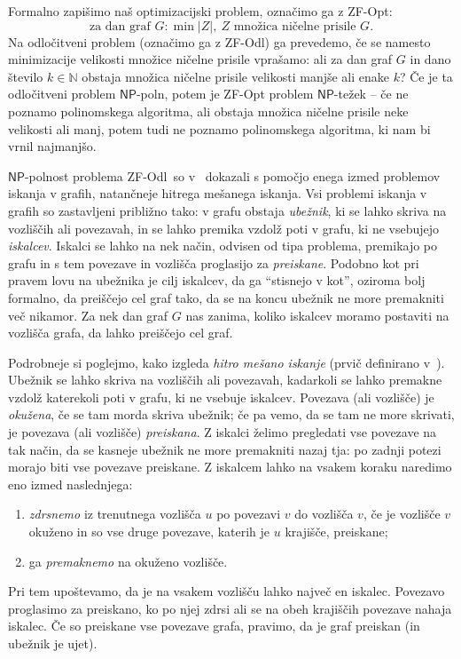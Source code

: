 \documentclass[12pt,a4paper,twoside]{article}
\theoremstyle{definition} %
\theoremstyle{plain} %
\numberwithin{equation}{section}  %
\newcommand{\N}{\mathbb N}
\newcommand{\NP}{\ensuremath{\mathsf{NP}}}
\newcommand{\ZFOdl}{\textsf{ZF-Odl}}
\begin{document}
Formalno zapišimo naš optimizacijski problem, označimo ga z \textsf{ZF-Opt}:
\[ \text{za dan graf } G\colon \min |Z|,\ Z \text{ množica ničelne prisile } G .\]
Na odločitveni problem (označimo ga z \ZFOdl) ga prevedemo, če se namesto minimizacije velikosti množice ničelne prisile vprašamo: ali za dan graf $G$ in dano število $k \in \N$ obstaja množica ničelne prisile velikosti manjše ali enake $k$? Če je ta odločitveni problem $\NP$-poln, potem je \textsf{ZF-Opt} problem $\NP$-težek -- če ne poznamo polinomskega algoritma, ali obstaja množica ničelne prisile neke velikosti ali manj, potem tudi ne poznamo polinomskega algoritma, ki nam bi vrnil najmanjšo. 

$\NP$-polnost problema \ZFOdl\ so v~\cite{fallat2016complexity} dokazali s pomočjo enega izmed problemov iskanja v grafih, natančneje hitrega mešanega iskanja. Vsi problemi iskanja v grafih so zastavljeni približno tako: v grafu obstaja \emph{ubežnik}, ki se lahko skriva na vozliščih ali povezavah, in se lahko premika vzdolž poti v grafu, ki ne vsebujejo \emph{iskalcev}. Iskalci se lahko na nek način, odvisen od tipa problema, premikajo po grafu in s tem povezave in vozlišča proglasijo za \emph{preiskane}. Podobno kot pri pravem lovu na ubežnika je cilj iskalcev, da ga ``stisnejo v kot'', oziroma bolj formalno, da preiščejo cel graf tako, da se na koncu ubežnik ne more premakniti več nikamor. Za nek dan graf $G$ nas zanima, koliko iskalcev moramo postaviti na vozlišča grafa, da lahko preiščejo cel graf. 

Podrobneje si poglejmo, kako izgleda \emph{hitro mešano iskanje} (prvič definirano v~\cite{yang2013fast}). Ubežnik se lahko skriva na vozliščih ali povezavah, kadarkoli se lahko premakne vzdolž katerekoli poti v grafu, ki ne vsebuje iskalcev. Povezava (ali vozlišče) je \emph{okužena}, če se tam morda skriva ubežnik; če pa vemo, da se tam ne more skrivati, je povezava (ali vozlišče) \emph{preiskana}. Z iskalci želimo pregledati vse povezave na tak način, da se kasneje ubežnik ne more premakniti nazaj tja: po zadnji potezi morajo biti vse povezave preiskane. Z iskalcem lahko na vsakem koraku naredimo eno izmed naslednjega:
\begin{enumerate}
    \item \emph{zdrsnemo} iz trenutnega vozlišča $u$ po povezavi $v$ do vozlišča $v$, če je vozlišče $v$ okuženo in so vse druge povezave, katerih je $u$ krajišče, preiskane;
    \item ga \emph{premaknemo} na okuženo vozlišče.
\end{enumerate}
Pri tem upoštevamo, da je na vsakem vozlišču lahko največ en iskalec. Povezavo proglasimo za preiskano, ko po njej zdrsi ali se na obeh krajiščih povezave nahaja iskalec. Če so preiskane vse povezave grafa, pravimo, da je graf preiskan (in ubežnik je ujet).
\end{document}
